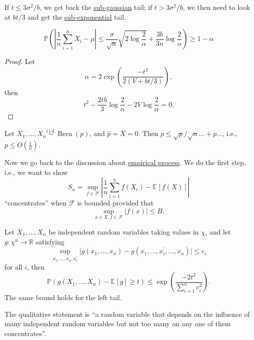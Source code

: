 \begin{remark}
	If \(t \leq 3 \sigma ^{2} / b\), we get back the \hyperref[def:sub-gaussian]{sub-gaussian} tail; if \(t > 3\sigma ^{2} / b\), we then need to look at \(bt / 3\) and get the \hyperref[def:sub-exponential]{sub-exponential} tail.
\end{remark}

\begin{proposition}
	\[
		\mathbb{P} \left( \left\vert \frac{1}{n} \sum_{i=1}^{n} X_i - \mu  \right\vert \leq \frac{\sigma}{\sqrt{n} } \sqrt{2 \log \frac{2}{\alpha }} + \frac{3b}{3n} \log \frac{2}{\alpha } \right) \geq 1 - \alpha
	\]
\end{proposition}
\begin{proof}
	Let
	\[
		\alpha = 2 \exp \left( \frac{- t^2}{2(V + bt / 3)} \right),
	\]
	then
	\[
		t^2 - \frac{2tb}{3}\log \frac{2}{\alpha } - 2 V \log \frac{2}{\alpha } = 0.
	\]
\end{proof}

\begin{eg}
	Let \(X_1 , \dots , X_n \overset{\text{i.i.d.} }{\sim } \mathop{\mathrm{Bern}}(p) \), and \(\hat{p} = \overline{X} = 0\). Then \(p \leq \sqrt{p} / \sqrt{n} \dots + p \dots  \), i.e., \(p \leq O(\frac{1}{n})\).
\end{eg}

Now we go back to the discussion about \hyperref[def:empirical-process]{empirical process}. We do the first step, i.e., we want to show
\[
	S_n = \sup _{f \in \mathscr{F} } \left\vert \frac{1}{n}\sum_{i=1}^{n} f(X_i) - \mathbb{E}_{}\left[f(X) \right]  \right\vert
\]
``concentrates'' when \(\mathscr{F} \) is bounded provided that
\[
	\sup _{x\in X, f\in \mathscr{F} } \vert f(x) \vert \leq B.
\]

\begin{theorem}\label{thm:bounded-difference-concentration-inequality}
	Let \(X_1, \dots , X_n\) be independent random variables taking values in \(\chi \), and let \(g\colon \chi ^n \to \mathbb{R} \) satisfying
	\[
		\sup _{x_1, \dots , x_n, x_i^{\prime} }\vert g(x_1, \dots , x_n) - g(x_1, \dots , x_i^{\prime} , \dots , x_n) \vert \leq c_i
	\]
	for all \(i\), then
	\[
		\mathbb{P} (g(X_1, \dots , X_n) - \mathbb{E}_{}\left[g \right] \geq t) \leq \exp \left( \frac{-2t^2}{\sum_{i=1}^{n} c_i^2} \right).
	\]
	The same bound holds for the left tail.
\end{theorem}

\begin{remark}
	The qualitative statement is ``a random variable that depends on the influence of many independent random variables but not too many on any one of them concentrates''.
\end{remark}

